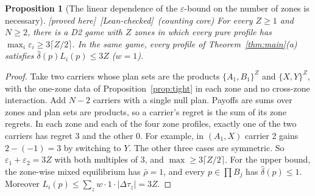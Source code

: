 \documentclass[11pt]{article}
\newtheorem{proposition}[theorem]{Proposition}
\theoremstyle{definition}
\theoremstyle{remark}
\newcommand{\PROVED}{\textsf{[proved here]}}
\newcommand{\LEAN}{\textsf{[Lean-checked]}}
\begin{document}
\begin{proposition}[The linear dependence of the $\varepsilon$-bound on the number of zones is necessary]\label{prop:cycles} \PROVED\ \LEAN\ (counting core)
For every $Z\ge1$ and $N\ge2$, there is a D2 game with $Z$ zones in which every pure profile has $\max_i\varepsilon_i\ge3\lceil Z/2\rceil$. In the same game, every profile of Theorem~\ref{thm:main}(a) satisfies $\hat\delta(p)L_i(p)\le3Z$ ($w=1$).
\end{proposition}
\begin{proof}
Take two carriers whose plan sets are the products $\{A_1,B_1\}^Z$ and $\{X,Y\}^Z$, with the one-zone data of Proposition~\ref{prop:tight} in each zone and no cross-zone interaction. Add $N-2$ carriers with a single null plan. Payoffs are sums over zones and plan sets are products, so a carrier's regret is the sum of its zone regrets. In each zone and each of the four zone profiles, exactly one of the two carriers has regret $3$ and the other $0$. For example, in $(A_1,X)$ carrier 2 gains $2-(-1)=3$ by switching to $Y$. The other three cases are symmetric. So $\varepsilon_1+\varepsilon_2=3Z$ with both multiples of $3$, and $\max\ge3\lceil Z/2\rceil$. For the upper bound, the zone-wise mixed equilibrium has $\bar\rho=1$, and every $p\in\prod B_j$ has $\hat\delta(p)\le1$. Moreover $L_i(p)\le\sum_zw\cdot1\cdot|\Delta\tau_z|=3Z$.
\end{proof}
\end{document}
